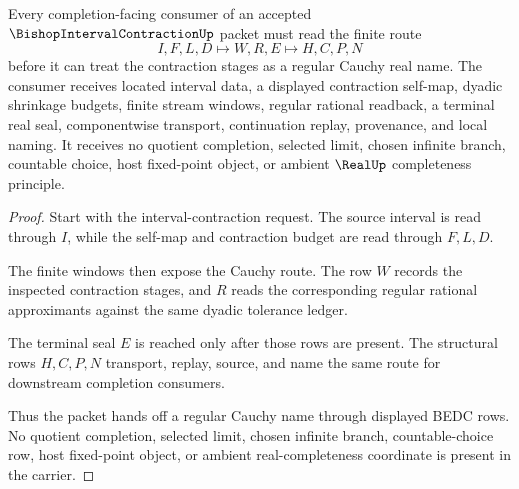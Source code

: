 \begin{theorem}
\label{thm:bishop-interval-contraction-cauchy-handoff}
Every completion-facing consumer of an accepted $\BishopIntervalContractionUp$ packet must read the finite route
$$
I,F,L,D \longmapsto W,R,E \longmapsto H,C,P,N
$$
before it can treat the contraction stages as a regular Cauchy real name. The consumer receives located interval data, a displayed contraction self-map, dyadic shrinkage budgets, finite stream windows, regular rational readback, a terminal real seal, componentwise transport, continuation replay, provenance, and local naming. It receives no quotient completion, selected limit, chosen infinite branch, countable choice, host fixed-point object, or ambient $\RealUp$ completeness principle.
\end{theorem}
\begin{proof}
Start with the interval-contraction request. The source interval is read through $I$, while the self-map and contraction budget are read through $F,L,D$.

The finite windows then expose the Cauchy route. The row $W$ records the inspected contraction stages, and $R$ reads the corresponding regular rational approximants against the same dyadic tolerance ledger.

The terminal seal $E$ is reached only after those rows are present. The structural rows $H,C,P,N$ transport, replay, source, and name the same route for downstream completion consumers.

Thus the packet hands off a regular Cauchy name through displayed BEDC rows. No quotient completion, selected limit, chosen infinite branch, countable-choice row, host fixed-point object, or ambient real-completeness coordinate is present in the carrier.
\end{proof}

